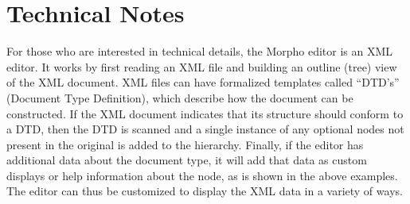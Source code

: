 \section{Technical Notes} \label{sec:technical-notes}

For those who are interested in technical details, the Morpho editor is
an XML editor. It works by first reading an XML file and building an
outline (tree) view of the XML document. XML files can have formalized
templates called ``DTD's'' (Document Type Definition), which describe how
the document can be constructed. If the XML document indicates that its
structure should conform to a DTD, then the DTD is scanned and a single
instance of any optional nodes not present in the original is added to
the hierarchy. Finally, if the editor has additional data about the
document type, it will add that data as custom displays or help
information about the node, as is shown in the above examples. The
editor can thus be customized to display the XML data in a variety of
ways.

